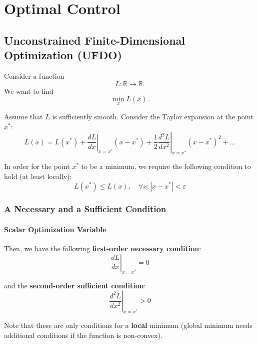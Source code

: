 
\section{Optimal Control}

\subsection{Unconstrained Finite-Dimensional Optimization (UFDO)}\label{UFDO}
Consider a function
\begin{equation*}
    L : \mathbb{R} \rightarrow \mathbb{R}.
\end{equation*}
We want to find
\begin{equation*}
    \min_x L(x).
\end{equation*}

Assume that $L$ is sufficiently smooth. Consider the Taylor expansion at the point $x^*$:
\begin{equation*}
    L(x) = L(x^*) + \left.\frac{dL}{dx}\right|_{x=x^*} (x - x^*) + \frac{1}{2} \left.\frac{d^2L}{dx^2}\right|_{x=x^*} {(x - x^*)}^2 + \ldots
\end{equation*}

In order for the point $x^*$ to be a minimum, we require the following condition to hold (at least locally):
\begin{equation*}
    L(x^*) \leq L(x), \quad \forall x : |x - x^*| < \varepsilon
\end{equation*}

\subsubsection{A Necessary and a Sufficient Condition}
\paragraph{Scalar Optimization Variable}
Then, we have the following \textbf{first-order necessary condition}:
\begin{equation*}
    \left.\frac{dL}{dx}\right|_{x = x^*} = 0
\end{equation*}

and the \textbf{second-order sufficient condition}:
\begin{equation*}
    \left.\frac{d^2L}{dx^2}\right|_{x = x^*} > 0
\end{equation*}

Note that these are only conditions for a \textbf{local} minimum (global minimum needs additional conditions if the function is non-convex).
